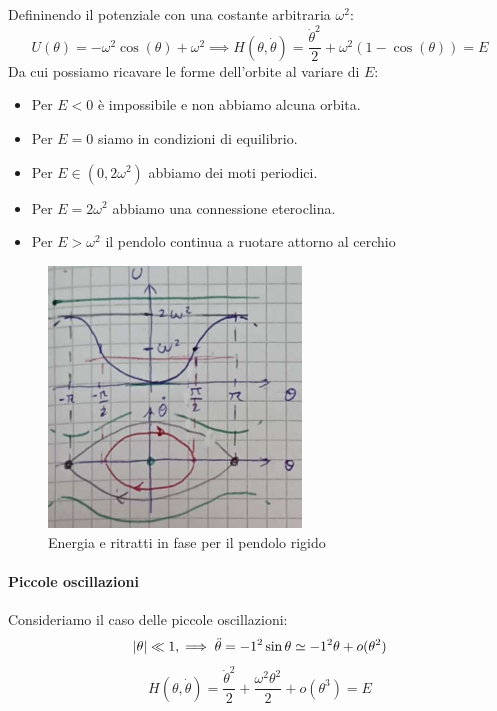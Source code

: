 \begin{example}
    Defininendo il potenziale con una costante arbitraria $\omega^2$:
    \begin{equation}
        U(\theta)= -\omega^2\cos(\theta)+\omega^2 \implies H(\theta,\dot{\theta})= \frac{\dot{\theta}^2}{2}+ \omega^2\left( 1-\cos(\theta) \right)= E 
    \end{equation}
    Da cui possiamo ricavare le forme dell'orbite al variare di $E$:
    \begin{itemize}
        \item Per $E<0$ è impossibile e non abbiamo alcuna orbita.
        \item Per $E=0$ siamo in condizioni di equilibrio.  
        \item Per $E \in (0,2\omega^2)$ abbiamo dei moti periodici.
        \item Per $E = 2\omega^2$ abbiamo una connessione eteroclina.
        \item Per $E > \omega^2$ il pendolo continua a ruotare attorno al cerchio
    \end{itemize}

    \begin{figure}[ht]
        \centering
        \includegraphics[width=0.6\textwidth]{images/orbitaPendoloRigido.png}
        \caption{Energia e ritratti in fase per il pendolo rigido}
    \end{figure}

    \paragraph{Piccole oscillazioni}
    Consideriamo il caso delle piccole oscillazioni: 
    \begin{equation*}
        \abs{\theta} \ll 1, \implies \ddot{\theta} = -1^2 \sin \theta \simeq -1^2 \theta + o(\theta^2)
    \end{equation*}
    \begin{equation*}
        H(\theta, \dot{\theta}) = \frac{\dot{\theta}^2}{2} + \frac{\omega^2 \theta^2}{2} + o(\theta^3) = E 
    \end{equation*}


\end{example}

